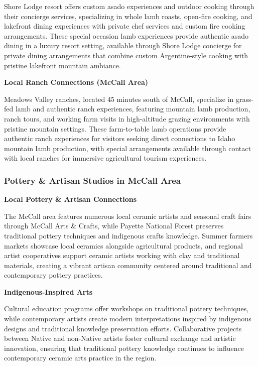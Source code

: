 \documentclass[
  11pt,
  letterpaper,
  DIV=10,
  numbers=noendperiod]{scrartcl}
\begin{document}
Shore Lodge resort offers custom asado experiences and outdoor cooking
through their concierge services, specializing in whole lamb roasts,
open-fire cooking, and lakefront dining experiences with private chef
services and custom fire cooking arrangements. These special occasion
lamb experiences provide authentic asado dining in a luxury resort
setting, available through Shore Lodge concierge for private dining
arrangements that combine custom Argentine-style cooking with pristine
lakefront mountain ambiance.

\textbf{Local Ranch Connections (McCall Area)}

Meadows Valley ranches, located 45 minutes south of McCall, specialize
in grass-fed lamb and authentic ranch experiences, featuring mountain
lamb production, ranch tours, and working farm visits in high-altitude
grazing environments with pristine mountain settings. These
farm-to-table lamb operations provide authentic ranch experiences for
visitors seeking direct connections to Idaho mountain lamb production,
with special arrangements available through contact with local ranches
for immersive agricultural tourism experiences.

\subsubsection{Pottery \& Artisan Studios in McCall
Area}\label{pottery-artisan-studios-in-mccall-area}

\textbf{Local Pottery \& Artisan Connections}

The McCall area features numerous local ceramic artists and seasonal
craft fairs through McCall Arts \& Crafts, while Payette National Forest
preserves traditional pottery techniques and indigenous crafts
knowledge. Summer farmers markets showcase local ceramics alongside
agricultural products, and regional artist cooperatives support ceramic
artists working with clay and traditional materials, creating a vibrant
artisan community centered around traditional and contemporary pottery
practices.

\textbf{Indigenous-Inspired Arts}

Cultural education programs offer workshops on traditional pottery
techniques, while contemporary artists create modern interpretations
inspired by indigenous designs and traditional knowledge preservation
efforts. Collaborative projects between Native and non-Native artists
foster cultural exchange and artistic innovation, ensuring that
traditional pottery knowledge continues to influence contemporary
ceramic arts practice in the region.
\end{document}
